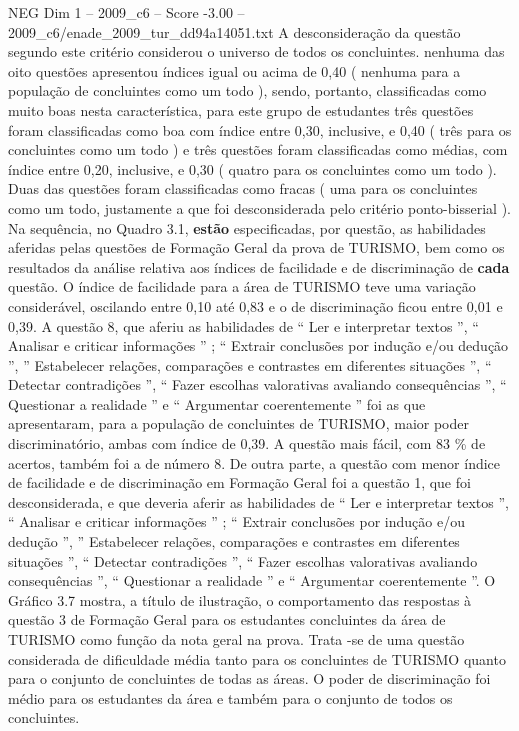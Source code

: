 \begin{textsample}{NEG Dim 1 – 2009\_c6 – Score -3.00 – 2009\_c6/enade\_2009\_tur\_dd94a14051.txt}
A desconsideração da questão segundo este critério considerou o universo de todos os concluintes. nenhuma das oito questões apresentou índices igual ou acima de 0,40 ( nenhuma para a população de concluintes como um todo ), sendo, portanto, classificadas como muito boas nesta característica, para este grupo de estudantes três questões foram classificadas como boa com índice entre 0,30, inclusive, e 0,40 ( três para os concluintes como um todo ) e três questões foram classificadas como médias, com índice entre 0,20, inclusive, e 0,30 ( quatro para os concluintes como um todo ).
Duas das questões foram classificadas como fracas ( uma para os concluintes como um todo, justamente a que foi desconsiderada pelo critério ponto-bisserial ).
Na sequência, no Quadro 3.1, \textbf{estão} especificadas, por questão, as habilidades aferidas pelas questões de Formação Geral da prova de TURISMO, bem como os resultados da análise relativa aos índices de facilidade e de discriminação de \textbf{cada} questão.
O índice de facilidade para a área de TURISMO teve uma variação considerável, oscilando entre 0,10 até 0,83 e o de discriminação ficou entre 0,01 e 0,39.
A questão 8, que aferiu as habilidades de “ Ler e interpretar textos ”, “ Analisar e criticar informações ” ; “ Extrair conclusões por indução e/ou dedução ”, ” Estabelecer relações, comparações e contrastes em diferentes situações ”, “ Detectar contradições ”, “ Fazer escolhas valorativas avaliando consequências ”, “ Questionar a realidade ” e “ Argumentar coerentemente ” foi as que apresentaram, para a população de concluintes de TURISMO, maior poder discriminatório, ambas com índice de 0,39.
A questão mais fácil, com 83 \% de acertos, também foi a de número 8.
De outra parte, a questão com menor índice de facilidade e de discriminação em Formação Geral foi a questão 1, que foi desconsiderada, e que deveria aferir as habilidades de “ Ler e interpretar textos ”, “ Analisar e criticar informações ” ; “ Extrair conclusões por indução e/ou dedução ”, ” Estabelecer relações, comparações e contrastes em diferentes situações ”, “ Detectar contradições ”, “ Fazer escolhas valorativas avaliando consequências ”, “ Questionar a realidade ” e “ Argumentar coerentemente ”.
O Gráfico 3.7 mostra, a título de ilustração, o comportamento das respostas à questão 3 de Formação Geral para os estudantes concluintes da área de TURISMO como função da nota geral na prova.
Trata -se de uma questão considerada de dificuldade média tanto para os concluintes de TURISMO quanto para o conjunto de concluintes de todas as áreas.
O poder de discriminação foi médio para os estudantes da área e também para o conjunto de todos os concluintes.

\end{textsample}

